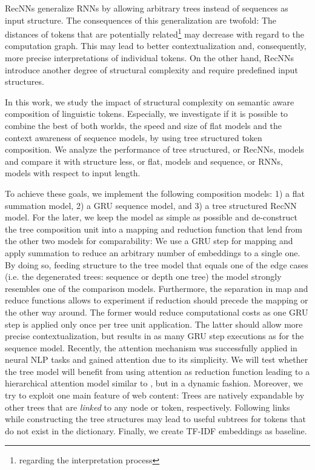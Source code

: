\acp{RecNN} generalize \acp{RNN} by allowing arbitrary trees instead of sequences as input structure. The consequences of this generalization are twofold: The distances of tokens that are potentially related\footnote{regarding the interpretation process} may decrease with regard to the computation graph. This may lead to better contextualization and, consequently, more precise interpretations of individual tokens. On the other hand, \acp{RecNN} introduce another degree of structural complexity and require predefined input structures. 

In this work, we study the impact of structural complexity on semantic aware composition of linguistic tokens. Especially, we investigate if it is possible to combine the best of both worlds, the speed and size of flat models and the context awareness of sequence models, by using tree structured token composition. We analyze the performance of tree structured, or \acp{RecNN}, models and compare it with structure less, or flat, models and sequence, or \acp{RNN}, models with respect to input length.

To achieve these goals, we implement the following composition models: 1) a flat summation model, 2) a \ac{GRU} sequence model, and 3) a tree structured \ac{RecNN} model. For the later, we keep the model as simple as possible and de-construct the tree composition unit into a mapping and reduction function that lend from the other two models for comparability: We use a \ac{GRU} step for mapping and apply summation to reduce an arbitrary number of embeddings to a single one. By doing so, feeding structure to the tree model that equals one of the edge cases (i.e. the degenerated trees: sequence or depth one tree) the model strongly resembles one of the comparison models. Furthermore, the separation in map and reduce functions allows to experiment if reduction should precede the mapping or the other way around. The former would reduce computational costs as one \ac{GRU} step is applied only once per tree unit application. The latter should allow more precise contextualization, but results in as many \ac{GRU} step executions as for the sequence model. Recently, the attention mechanism \autocite{bahdanau_neural_2014,xu_show_2015} was successfully applied in neural \ac{NLP} tasks \autocite{zhuang_neobility_2017,vaswani_attention_2017} and gained attention due to its simplicity. We will test whether the tree model will benefit from using attention as reduction function leading to a hierarchical attention model similar to \textcite{yang_hierarchical_2016}, but in a dynamic fashion. Moreover, we try to exploit one main feature of web content: Trees are natively expandable by other trees that are \textit{linked} to any node or token, respectively. Following links while constructing the tree structures may lead to useful subtrees for tokens that do not exist in the dictionary. Finally, we create \ac{TF-IDF} embeddings as baseline.   

